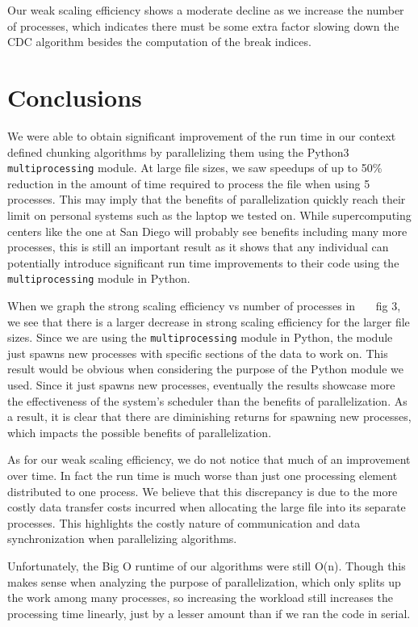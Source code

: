 \documentclass{acmtog} %
\begin{document}
	Our weak scaling efficiency shows a moderate decline as we increase the number of processes, which indicates there must be some extra factor slowing down the CDC algorithm besides the computation of the break indices. 
	
	\section{Conclusions}
	We were able to obtain significant improvement of the run time in our context defined chunking algorithms by parallelizing them using the Python3 \texttt{multiprocessing} module. At large file sizes, we saw speedups of up to 50\% reduction in the amount of time required to process the file when using 5 processes. This may imply that the benefits of parallelization quickly reach their limit on personal systems such as the laptop we tested on. While supercomputing centers like the one at San Diego will probably see benefits including many more processes, this is still an important result as it shows that any individual can potentially introduce significant run time improvements to their code using the \texttt{multiprocessing} module in Python. 
	
	When we graph the strong scaling efficiency vs number of processes in ~~~fig 3, we see that there is a larger decrease in strong scaling efficiency for the larger file sizes. Since we are using the \texttt{multiprocessing} module in Python, the module just spawns new processes with specific sections of the data to work on. This result would be obvious when considering the purpose of the Python module we used. Since it just spawns new processes, eventually the results showcase more the effectiveness of the system's scheduler than the benefits of parallelization. As a result, it is clear that there are diminishing returns for spawning new processes, which impacts the possible benefits of parallelization. 
	
	As for our weak scaling efficiency, we do not notice that much of an improvement over time. In fact the run time is much worse than just one processing element distributed to one process. We believe that this discrepancy is due to the more costly data transfer costs incurred when allocating the large file into its separate processes. This highlights the costly nature of communication and data synchronization when parallelizing algorithms. 

	
	Unfortunately, the Big O runtime of our algorithms were still O(n). Though this makes sense when analyzing the purpose of parallelization, which only splits up the work among many processes, so increasing the workload still increases the processing time linearly, just by a lesser amount than if we ran the code in serial. 
		
	
\end{document}
